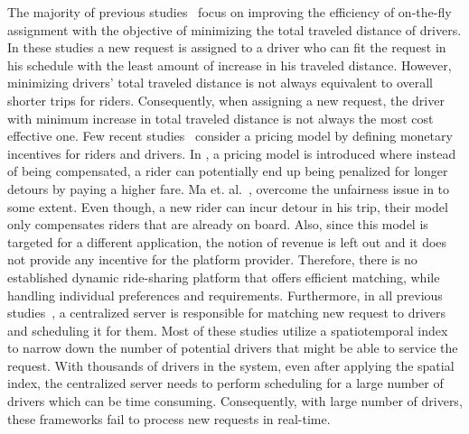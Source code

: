 The majority of previous studies~\cite{Ota15, Cici15, Cao15, PelzerITS15} focus on improving the efficiency of on-the-fly assignment with the objective of minimizing the total traveled distance of drivers. In these studies a new request is assigned to a driver who can fit the request in his schedule with the least amount of increase in his traveled distance. However, minimizing drivers' total traveled distance is not always equivalent to overall shorter trips for riders. Consequently, when assigning a new request, the driver with minimum increase in total traveled distance is not always the most cost effective one. Few recent studies~\cite{Ma13,ßMa15} consider a pricing model by defining monetary incentives for riders and drivers. In \cite{Ma13}, a pricing model is introduced where instead of being compensated, a rider can potentially end up being penalized for longer detours by paying a higher fare. Ma et. al.~\cite{Ma15}, overcome the unfairness issue in \cite{Ma13} to some extent. Even though, a new rider can incur detour in his trip, their model only compensates riders that are already on board. Also, since this model is targeted for a different application, the notion of revenue is left out and it does not provide any incentive for the platform provider. Therefore, there is no established dynamic ride-sharing platform that offers efficient matching, while handling individual preferences and requirements. Furthermore, in all previous studies~\cite{Ma13,Huang14,Ma15}, a centralized server is responsible for matching new request to drivers and scheduling it for them. Most of these studies utilize a spatiotemporal index to narrow down the number of potential drivers that might be able to service the request. With thousands of drivers in the system, even after applying the spatial index, the centralized server needs to perform scheduling for a large number of drivers which can be time consuming. Consequently, with large number of drivers, these frameworks fail to process new requests in real-time.




